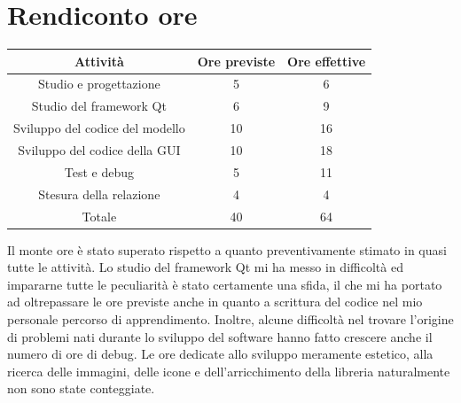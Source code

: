 \documentclass[10pt]{article}
\begin{document}
\section{Rendiconto ore}
\begin{center}
    \begin{tabular}{| c | c | c |} \hline
    Attività & Ore previste & Ore effettive \\\hline
    Studio e progettazione & 5 & 6 \\
    Studio del framework Qt & 6 & 9 \\
    Sviluppo del codice del modello & 10 & 16 \\
    Sviluppo del codice della GUI & 10 & 18 \\
    Test e debug & 5 & 11 \\
    Stesura della relazione & 4 & 4 \\\hline
    Totale & 40 & 64 \\\hline
    \end{tabular}
\end{center}
Il monte ore è stato superato rispetto a quanto preventivamente stimato in quasi tutte le attività. Lo studio del framework Qt mi ha messo in difficoltà ed impararne tutte le peculiarità è stato certamente una sfida, il che mi ha portato ad oltrepassare le ore previste anche in quanto a scrittura del codice nel mio personale percorso di apprendimento. Inoltre, alcune difficoltà nel trovare l'origine di problemi nati durante lo sviluppo del software hanno fatto crescere anche il numero di ore di debug. Le ore dedicate allo sviluppo meramente estetico, alla ricerca delle immagini, delle icone e dell'arricchimento della libreria naturalmente non sono state conteggiate.
\end{document}
